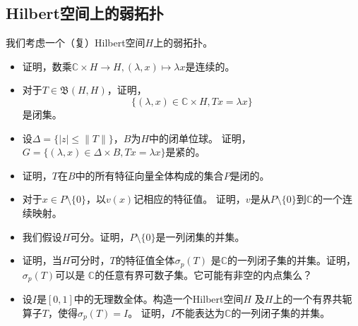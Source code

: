 \subsection*{Hilbert空间上的弱拓扑}
\qquad 我们考虑一个（复）Hilbert空间$H$上的弱拓扑。
\begin{itemize}
    \item[(1)] 证明，数乘$\mathbb{C} \times H \to H,
    (\lambda,x)\mapsto\lambda x$是连续的。
    \item[(2)] 对于$T\in\mathfrak{B}(H,H)$，证明，
    \[\{(\lambda,x)\in\mathbb{C} \times H,Tx=\lambda x\}\]
    是闭集。
    \item[(3)] 设$\Delta=\{|z|\leqslant\|T\|\}$，$B$为$H$中的闭单位球。
    证明，$G=\{(\lambda,x)\in\Delta \times B,Tx=\lambda x\}$是紧的。
    \item[(4)] 证明，$T$在$B$中的所有特征向量全体构成的集合$P$是闭的。
    \item[(5)] 对于$x\in P\setminus\{0\}$，以$v(x)$记相应的特征值。
    证明，$v$是从$P\setminus\{0\}$到$\mathbb{C}$的一个连续映射。
    \item[(6)] 我们假设$H$可分。证明，$P\setminus\{0\}$是一列闭集的并集。
    \item[(7)] 证明，当$H$可分时，$T$的特征值全体$\sigma_p(T)$
    是$\mathbb{C}$的一列闭子集的并集。证明，$\sigma_p(T)$可以是
    $\mathbb{C}$的任意有界可数子集。它可能有非空的内点集么？
    \item[(8)] 设$I$是$[0,1]$中的无理数全体。构造一个Hilbert空间$H$
    及$H$上的一个有界共轭算子$T$，使得$\sigma_p(T)=I$。
    证明，$I$不能表达为$\mathbb{C}$的一列闭子集的并集。
\end{itemize}
